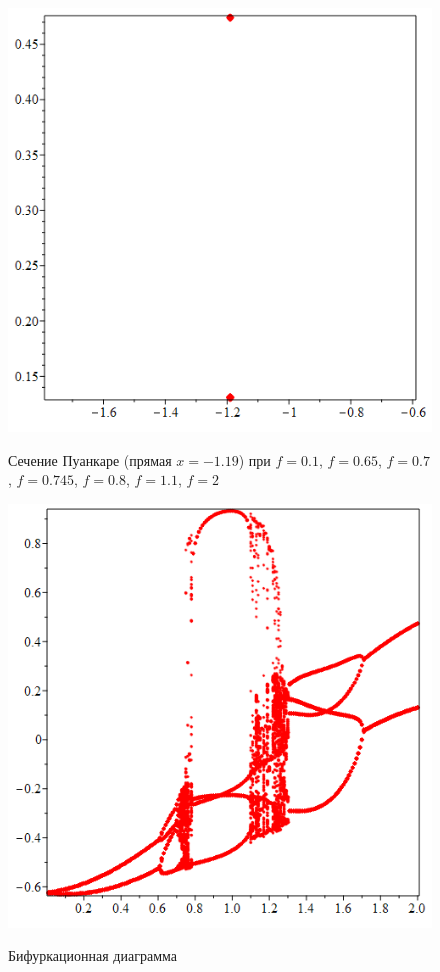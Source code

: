 \documentclass[10pt,a4paper]{article}
\begin{document}
\begin{figure}[h]
		{\includegraphics[scale=0.2]{poincare f=2}}
		\caption{Сечение Пуанкаре (прямая $x = -1.19$) при $f = 0.1$, $f = 0.65$, $f = 0.7$, $f = 0.745$, $f = 0.8$, $f = 1.1$, $f = 2$}
		\label{image/2}
	\end{figure}

	\begin{figure}[h]
		\centering
		{\includegraphics[scale=0.5]{bifurcation 0.01}}
		\caption{Бифуркационная диаграмма}
		\label{image/2}
	\end{figure}
\end{document}
